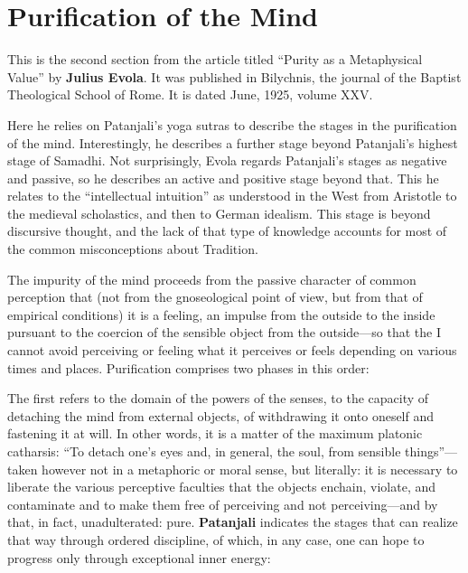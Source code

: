 \section{Purification of the Mind}

\begin{quotex}
This is the second section from the article titled “Purity as a Metaphysical Value” by \textbf{Julius Evola}. It was published in Bilychnis, the journal of the Baptist Theological School of Rome. It is dated June, 1925, volume XXV.

Here he relies on Patanjali's yoga sutras to describe the stages in the purification of the mind. Interestingly, he describes a further stage beyond Patanjali's highest stage of Samadhi. Not surprisingly, Evola regards Patanjali's stages as negative and passive, so he describes an active and positive stage beyond that. This he relates to the “intellectual intuition” as understood in the West from Aristotle to the medieval scholastics, and then to German idealism. This stage is beyond discursive thought, and the lack of that type of knowledge accounts for most of the common misconceptions about Tradition. 

\end{quotex}
The impurity of the mind proceeds from the passive character of common perception that (not from the gnoseological point of view, but from that of empirical conditions) it is a feeling, an impulse from the outside to the inside pursuant to the coercion of the sensible object from the outside—so that the I cannot avoid perceiving or feeling what it perceives or feels depending on various times and places. Purification comprises two phases in this order: 

The first refers to the domain of the powers of the senses, to the capacity of detaching the mind from external objects, of withdrawing it onto oneself and fastening it at will. In other words, it is a matter of the maximum platonic catharsis: “To detach one's eyes and, in general, the soul, from sensible things”—taken however not in a metaphoric or moral sense, but literally: it is necessary to liberate the various perceptive faculties that the objects enchain, violate, and contaminate and to make them free of perceiving and not perceiving—and by that, in fact, unadulterated: pure. \textbf{Patanjali} indicates the stages that can realize that way through ordered discipline, of which, in any case, one can hope to progress only through exceptional inner energy:

